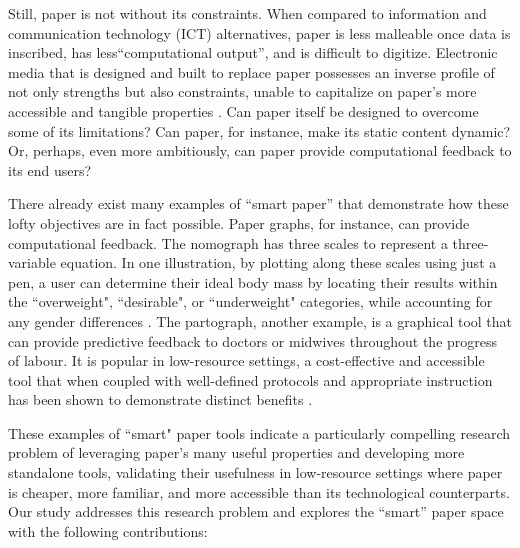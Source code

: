\documentclass{sig-alternate}
\begin{document}
Still, paper is not without its constraints. When compared to information and communication technology (ICT) alternatives, paper is less malleable once data is inscribed, has less``computational output'', and is difficult to digitize. Electronic media that is designed and built to replace paper possesses an inverse profile of not only strengths but also constraints, unable to capitalize on paper's more accessible and tangible properties \cite{johnson1993}. Can paper itself be designed to overcome some of its limitations? Can paper, for instance, make its static content dynamic? Or, perhaps, even more ambitiously, can paper provide computational feedback to its end users?

There already exist many examples of ``smart paper'' that demonstrate how these lofty objectives are in fact possible. Paper graphs, for instance, can provide computational feedback. The nomograph has three scales to represent a three-variable equation. In one illustration, by plotting along these scales using just a pen, a user can determine their ideal body mass by locating their results within the ``overweight", ``desirable", or ``underweight" categories, while accounting for any gender differences \cite{thomas1976}. The partograph, another example, is a graphical tool that can provide predictive feedback to doctors or midwives throughout the progress of labour\cite{who1988}. It is popular in low-resource settings, a cost-effective and accessible tool that when coupled with well-defined protocols and appropriate instruction has been shown to demonstrate distinct benefits \cite{fawole2009, umezulike1999, fahdy2005, pettersson2000}.

These examples of ``smart" paper tools indicate a particularly compelling research problem of leveraging paper's many useful properties and developing more standalone tools, validating their usefulness in low-resource settings where paper is cheaper, more familiar, and more accessible than its technological counterparts. Our study addresses this research problem and explores the ``smart'' paper space with the following contributions:
\end{document}
